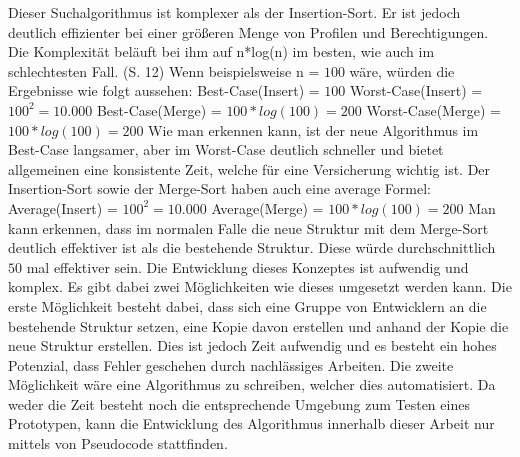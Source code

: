 Dieser Suchalgorithmus ist komplexer als der Insertion-Sort. Er ist jedoch deutlich effizienter bei einer größeren Menge von Profilen und Berechtigungen.
Die Komplexität beläuft bei ihm auf n*log(n) im besten, wie auch im schlechtesten Fall. \cite{weblogMer,log} (S. 12)
\newline
Wenn beispielsweise n = $100$ wäre, würden die Ergebnisse wie folgt aussehen:
\newline
\newline
Best-Case(Insert) = $100$
\newline
Worst-Case(Insert) = $100^2 = 10.000$
\newline
\newline
Best-Case(Merge) = $100*log(100) = 200$
\newline
Worst-Case(Merge) = $100*log(100) = 200$
\newline
\newline
Wie man erkennen kann, ist der neue Algorithmus im Best-Case langsamer, aber im Worst-Case deutlich schneller und bietet allgemeinen eine konsistente Zeit, welche für eine Versicherung wichtig ist.
Der Insertion-Sort sowie der Merge-Sort haben auch eine average Formel: \cite{weblogMer,weblogIn}
\newline
\newline
Average(Insert) = $100^2 = 10.000$
\newline
\newline
Average(Merge) = $100*log(100) = 200$
\newline
\newline
Man kann erkennen, dass im normalen Falle die neue Struktur mit dem Merge-Sort deutlich effektiver ist als die bestehende Struktur.
Diese würde durchschnittlich $50$ mal effektiver sein.
\newline
\newline
Die Entwicklung dieses Konzeptes ist aufwendig und komplex.
Es gibt dabei zwei Möglichkeiten wie dieses umgesetzt werden kann.
Die erste Möglichkeit besteht dabei, dass sich eine Gruppe von Entwicklern an die bestehende Struktur setzen, eine Kopie davon erstellen und anhand der Kopie die neue Struktur erstellen.
Dies ist jedoch Zeit aufwendig und es besteht ein hohes Potenzial, dass Fehler geschehen durch nachlässiges Arbeiten.
\newline
Die zweite Möglichkeit wäre eine Algorithmus zu schreiben, welcher dies automatisiert.
Da weder die Zeit besteht noch die entsprechende Umgebung zum Testen eines Prototypen, kann die Entwicklung des Algorithmus innerhalb dieser Arbeit nur mittels von Pseudocode stattfinden.
